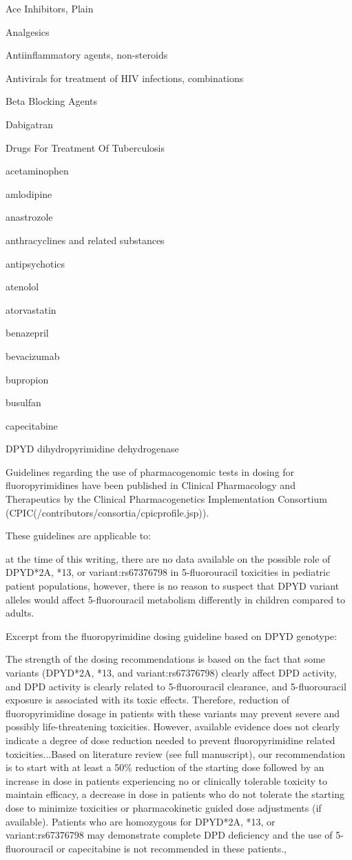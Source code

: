 \documentclass{resume} %
\begin{document}
\begin{rSection}{ Ace Inhibitors, Plain }
\begin{rSection}{ Analgesics }
\begin{rSection}{ Antiinflammatory agents, non-steroids }
\begin{rSection}{ Antivirals for treatment of HIV infections, combinations }
\begin{rSection}{ Beta Blocking Agents }
\begin{rSection}{ Dabigatran }
\begin{rSection}{ Drugs For Treatment Of Tuberculosis }
\begin{rSection}{ acetaminophen }
\begin{rSection}{ amlodipine }
\begin{rSection}{ anastrozole }
\begin{rSection}{ anthracyclines and related substances }
\begin{rSection}{ antipsychotics }
\begin{rSection}{ atenolol }
\begin{rSection}{ atorvastatin }
\begin{rSection}{ benazepril }
\begin{rSection}{ bevacizumab }
\begin{rSection}{ bupropion }
\begin{rSection}{ busulfan }
\begin{rSection}{ capecitabine }
\begin{rSubsection}{ DPYD }{ dihydropyrimidine dehydrogenase }{}{}
\item Guidelines regarding the use of pharmacogenomic tests in dosing for fluoropyrimidines have been published in Clinical Pharmacology and Therapeutics by the Clinical Pharmacogenetics Implementation Consortium (CPIC(/contributors/consortia/cpicprofile.jsp)).
 \newline
\item These guidelines are applicable to:
 \newline
\item at the time of this writing, there are no data available on the possible role of DPYD*2A, *13, or variant:rs67376798 in 5-fluorouracil toxicities in pediatric patient populations,  however, there is no reason to suspect that DPYD variant alleles would affect 5-fluorouracil metabolism differently in children compared to adults.
 \newline
\item Excerpt from the fluoropyrimidine dosing guideline based on DPYD genotype:
 \newline
\item The strength of the dosing recommendations is based on the fact that some variants (DPYD*2A, *13, and variant:rs67376798) clearly affect DPD activity, and DPD activity is clearly related to 5-fluorouracil clearance, and 5-fluorouracil exposure is associated with its toxic effects. Therefore, reduction of fluoropyrimidine dosage in patients with these variants may prevent severe and possibly life-threatening toxicities. However, available evidence does not clearly indicate a degree of dose reduction needed to prevent fluoropyrimidine related toxicities...Based on literature review (see full manuscript), our recommendation is to start with at least a 50\% reduction of the starting dose followed by an increase in dose in patients experiencing no or clinically tolerable toxicity to maintain efficacy, a decrease in dose in patients who do not tolerate the starting dose to minimize toxicities or pharmacokinetic guided dose adjustments (if available). Patients who are homozygous for DPYD*2A, *13, or variant:rs67376798 may demonstrate complete DPD deficiency and the use of 5-fluorouracil or capecitabine is not recommended in these patients.,  

\end{rSubsection}
\end{rSection}
\end{rSection}
\end{rSection}
\end{rSection}
\end{rSection}
\end{rSection}
\end{rSection}
\end{rSection}
\end{rSection}
\end{rSection}
\end{rSection}
\end{rSection}
\end{rSection}
\end{rSection}
\end{rSection}
\end{rSection}
\end{rSection}
\end{rSection}
\end{rSection}
\end{document}
